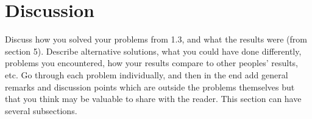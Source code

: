 \section{Discussion}
Discuss how you solved your problems from 1.3, and what the results were (from section 5). Describe alternative solutions, what you could have done differently, problems you encountered, how your results compare to other peoples' results, etc. Go through each problem individually, and then in the end add general remarks and discussion points which are outside the problems themselves but that you think may be valuable to share with the reader. This section can have several subsections.
